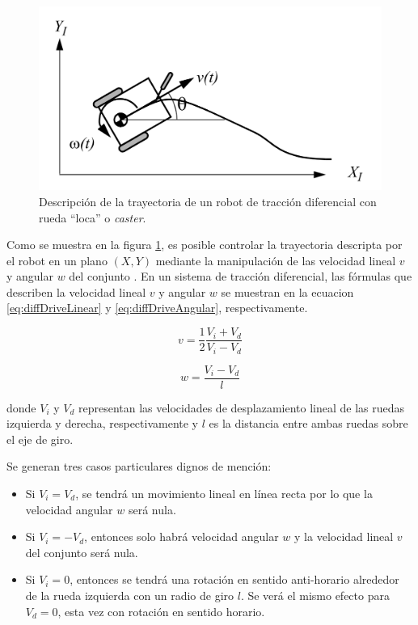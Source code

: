 \begin{figure}[ht]
    \centering
    \includegraphics[scale=0.8]{./Figures/diff_drive.png}
    \caption{Descripción de la trayectoria de un robot de tracción diferencial con rueda ``loca'' o \textit{caster}.}
    \label{fig:diffdrive}
\end{figure}

Como se muestra en la figura \ref{fig:diffdrive}, es posible controlar la trayectoria descripta por el robot en un plano $(X,Y)$ mediante la manipulación de las velocidad lineal $v$ y angular $w$ del conjunto \citep{BOOK:3}. En un sistema de tracción diferencial, las fórmulas que describen la velocidad lineal $v$ y angular $w$ se muestran en la ecuacion \ref{eq:diffDriveLinear} y \ref{eq:diffDriveAngular}, respectivamente.

\begin{equation}
    \label{eq:diffDriveLinear}
    v = \frac{1}{2} \frac{V_i + V_d}{V_i - V_d}
\end{equation}

\begin{equation}
    \label{eq:diffDriveAngular}
    w = \frac{V_i - V_d}{l}
\end{equation}

donde $V_i$ y $V_d$ representan las velocidades de desplazamiento lineal de las ruedas izquierda y derecha, respectivamente y $l$ es la distancia entre ambas ruedas sobre el eje de giro.

Se generan tres casos particulares dignos de mención:
\begin{itemize}
    \item Si $V_i = V_d$, se tendrá un movimiento lineal en línea recta por lo que la velocidad angular $w$ será nula.
    \item Si $V_i = - V_d$, entonces solo habrá velocidad angular $w$ y la velocidad lineal $v$ del conjunto será nula.
    \item Si $V_i = 0$, entonces se tendrá una rotación en sentido anti-horario alrededor de la rueda izquierda con un radio de giro $l$. Se verá el mismo efecto para $V_d = 0$, esta vez con rotación en sentido horario.
\end{itemize}

